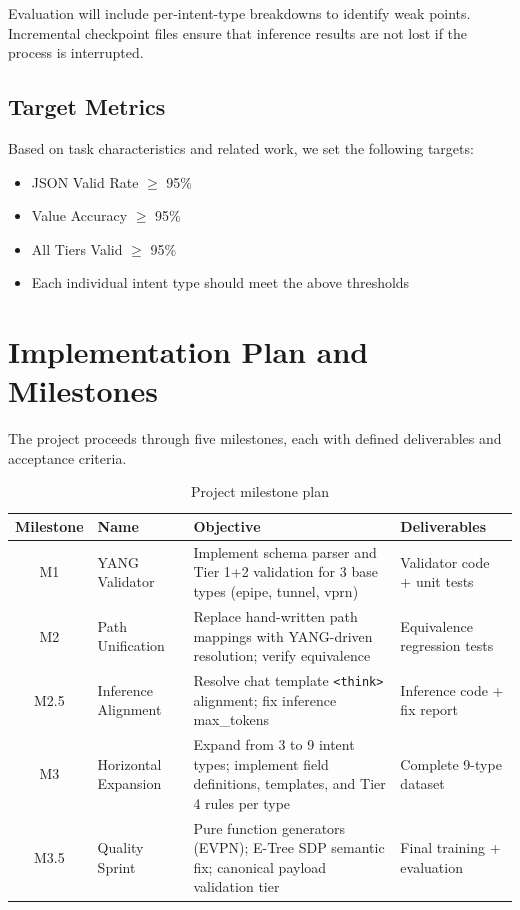 \documentclass[12pt, a4paper]{article}
\begin{document}
\noindent
Evaluation will include per-intent-type breakdowns to identify weak points. Incremental checkpoint files ensure that inference results are not lost if the process is interrupted.

\subsection{Target Metrics}

Based on task characteristics and related work, we set the following targets:

\begin{itemize}
  \item JSON Valid Rate $\geq$ 95\%
  \item Value Accuracy $\geq$ 95\%
  \item All Tiers Valid $\geq$ 95\%
  \item Each individual intent type should meet the above thresholds
\end{itemize}

\section{Implementation Plan and Milestones}
\label{sec:milestones}

The project proceeds through five milestones, each with defined deliverables and acceptance criteria.

\begin{table}[H]
\centering
\caption{Project milestone plan}
\label{tab:milestones}
\small
\begin{tabular}{clp{7cm}l}
\toprule
\textbf{Milestone} & \textbf{Name} & \textbf{Objective} & \textbf{Deliverables} \\
\midrule
M1 & YANG Validator &
  Implement schema parser and Tier 1+2 validation for 3 base types (epipe, tunnel, vprn) &
  Validator code + unit tests \\
\addlinespace
M2 & Path Unification &
  Replace hand-written path mappings with YANG-driven resolution; verify equivalence &
  Equivalence regression tests \\
\addlinespace
M2.5 & Inference Alignment &
  Resolve chat template \texttt{<think>} alignment; fix inference max\_tokens &
  Inference code + fix report \\
\addlinespace
M3 & Horizontal Expansion &
  Expand from 3 to 9 intent types; implement field definitions, templates, and Tier 4 rules per type &
  Complete 9-type dataset \\
\addlinespace
M3.5 & Quality Sprint &
  Pure function generators (EVPN); E-Tree SDP semantic fix; canonical payload validation tier &
  Final training + evaluation \\
\bottomrule
\end{tabular}
\end{table}
\end{document}
